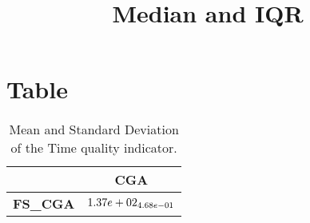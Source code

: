 \documentclass{article}
\title{Median and IQR}
\author{}
\begin{document}
\maketitle
\section{Table}
\begin{table}[!htp]
  \caption{Mean and Standard Deviation of the Time quality indicator.}
  \label{table:Time}
  \centering
  \begin{scriptsize}
  \begin{tabular}{c|c}
      & \textbf{CGA} \\\hline
      \textbf{FS_CGA} & $\cellcolor{gray95} \cellcolor{gray25} 1.37e+02_{4.68e-01}$ \\
  \end{tabular}
  \end{scriptsize}
\end{table}
\end{document}
